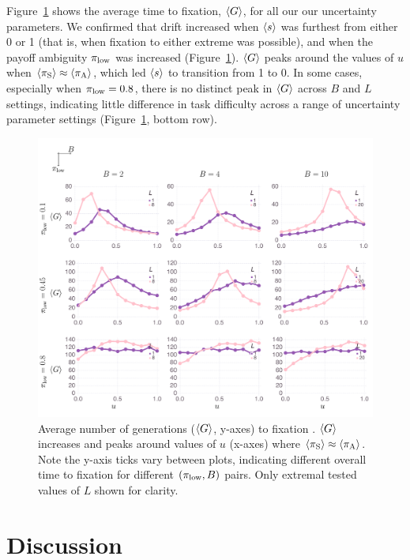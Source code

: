 \documentclass[letterpaper,11.5pt]{scrartcl}
\begin{document}
Figure~\ref{fig:steps} shows the average time to fixation, $\langle G \rangle$, for all our our uncertainty parameters. We confirmed that drift increased when $\langle s \rangle$ was furthest from either 0 or 1 (that is, when fixation to either extreme was possible), 
and when the payoff ambiguity $\pi_{\mathrm{low}}$ was increased (Figure~\ref{fig:steps}). 
$\langle G \rangle$ peaks around the values of $u$ 
when $\langle \pi_\mathrm{S} \rangle \approx \langle \pi_\mathrm{A} \rangle$, which led $\langle s \rangle$ to transition from 1 to 0.
In some cases, especially when $\pi_{\mathrm{low}}=0.8$,
there is no distinct peak in $\langle G \rangle$ across $B$ and $L$ settings, 
indicating little difference in task difficulty across a range of uncertainty
parameter settings (Figure~\ref{fig:steps}, bottom row).


\begin{figure}
  \caption{Average number of generations ($\langle G \rangle$, y-axes) to fixation . 
    $\langle G \rangle$ increases and peaks around values of $u$ (x-axes) where
  $\langle \pi_\mathrm{S} \rangle \approx \langle \pi_\mathrm{A} \rangle$. Note the y-axis ticks vary between plots,
indicating different overall time to fixation for different $(\pi_{\mathrm{low}}, B)$
pairs. Only extremal tested values of $L$ shown for clarity.} 
  \label{fig:steps}
\centering
    \includegraphics[width=\textwidth]{Figures/stepResultsPlots.pdf}
\end{figure}


\section{Discussion}
\end{document}
